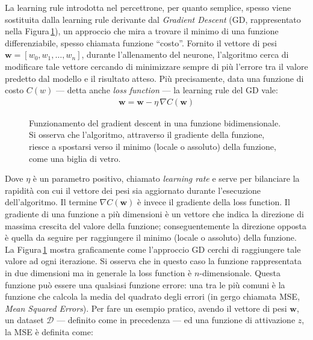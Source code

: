 La learning rule introdotta nel percettrone, per quanto semplice, spesso viene sostituita dalla learning rule derivante dal \textit{Gradient Descent} (\acs{GD}, rappresentato nella Figura\,\ref{fig:gradient-descent}), un approccio che mira a trovare il minimo di una funzione differenziabile, spesso chiamata funzione ``costo''. Fornito il vettore di pesi $\mathbf{w} = \left[w_0, w_1, \dots, w_n \right]$, durante l'allenamento del neurone, l'algoritmo cerca di modificare tale vettore cercando di minimizzare sempre di più l'errore tra il valore predetto dal modello e il risultato atteso. Più precisamente, data una funzione di costo $C(w)$ — detta anche \textit{loss function} — la learning rule del \acs{GD} vale:
% 
\begin{gather*}
    \mathbf{w} = \mathbf{w} - \eta\,\nabla C\left(\mathbf{w}\right)
\end{gather*}
% 
\begin{figure}[!b]
    \centering
    
    \caption[Funzionamento del gradient descent in una funzione bidimensionale.]{Funzionamento del gradient descent in una funzione bidimensionale. Si osserva che l'algoritmo, attraverso il gradiente della funzione, riesce a spostarsi verso il minimo (locale o assoluto) della funzione, come una biglia di vetro.}\label{fig:gradient-descent}
\end{figure}
% 
\noindent Dove $\eta$ è un parametro positivo, chiamato \textit{learning rate} e serve per bilanciare la rapidità con cui il vettore dei pesi sia aggiornato durante l'esecuzione dell'algoritmo. Il termine $\nabla C\left(\mathbf{w}\right)$ è invece il gradiente della loss function. Il gradiente di una funzione a più dimensioni è un vettore che indica la direzione di massima crescita del valore della funzione; conseguentemente la direzione opposta è quella da seguire per raggiungere il minimo (locale o assoluto) della funzione. La Figura\,\ref{fig:gradient-descent} mostra graficamente come l'approccio \acs{GD} cerchi di raggiungere tale valore ad ogni iterazione. Si osserva che in questo caso la funzione rappresentata in due dimensioni ma in generale la loss function è $n$-dimensionale. Questa funzione può essere una qualsiasi funzione errore: una tra le più comuni è la funzione che calcola la media del quadrato degli errori (in gergo chiamata \acs{MSE}, \textit{Mean Squared Errors}). Per fare un esempio pratico, avendo il vettore di pesi $\mathbf{w}$, un dataset $\mathcal{D}$ — definito come in precedenza — ed una funzione di attivazione $z$, la \acs{MSE} è definita come:
